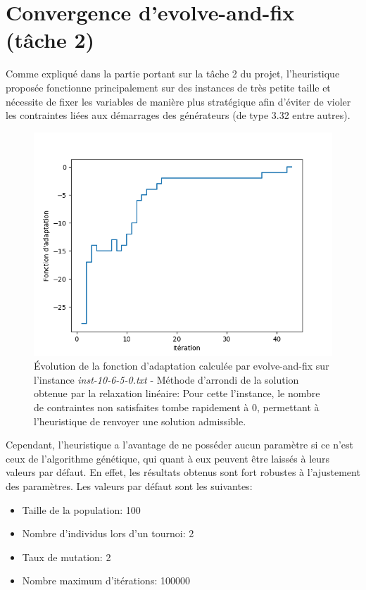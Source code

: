 \vspace*{1.2cm}


\section{Convergence d'evolve-and-fix (tâche 2)}

Comme expliqué dans la partie portant sur la tâche 2 du projet, 
l'heuristique proposée fonctionne principalement sur des instances de très petite
taille et nécessite de fixer les variables de manière plus stratégique afin
d'éviter de violer les contraintes liées aux démarrages des générateurs
(de type 3.32 entre autres).

\begin{figure}[h!]
\begin{center}
	\includegraphics[width=.5\textwidth]{imgs/round}
	\caption{\'Evolution de la fonction d'adaptation calculée par evolve-and-fix
    sur l'instance \textit{inst-10-6-5-0.txt} - Méthode d'arrondi de la solution
    obtenue par la relaxation linéaire: Pour cette l'instance, le nombre de contraintes
    non satisfaites tombe rapidement à 0, permettant à l'heuristique de renvoyer
    une solution admissible.}
\end{center}
\end{figure}

Cependant, l'heuristique a l'avantage de ne posséder aucun paramètre si ce n'est ceux
de l'algorithme génétique, qui quant à eux peuvent être laissés à leurs valeurs par
défaut. En effet, les résultats obtenus sont fort robustes à l'ajustement des paramètres.
Les valeurs par défaut sont les suivantes:
\begin{itemize}
    \item Taille de la population: 100
    \item Nombre d'individus lors d'un tournoi: 2
    \item Taux de mutation: 2
    \item Nombre maximum d'itérations: 100000
\end{itemize}
\newpage
